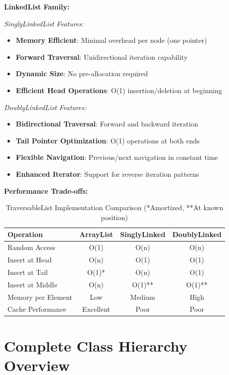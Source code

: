 \documentclass[12pt,a4paper]{article}
\begin{document}
\textbf{LinkedList Family:}

\textit{SinglyLinkedList Features:}
\begin{itemize}
    \item \textbf{Memory Efficient}: Minimal overhead per node (one pointer)
    \item \textbf{Forward Traversal}: Unidirectional iteration capability
    \item \textbf{Dynamic Size}: No pre-allocation required
    \item \textbf{Efficient Head Operations}: O(1) insertion/deletion at beginning
\end{itemize}

\textit{DoublyLinkedList Features:}
\begin{itemize}
    \item \textbf{Bidirectional Traversal}: Forward and backward iteration
    \item \textbf{Tail Pointer Optimization}: O(1) operations at both ends
    \item \textbf{Flexible Navigation}: Previous/next navigation in constant time
    \item \textbf{Enhanced Iterator}: Support for reverse iteration patterns
\end{itemize}

\textbf{Performance Trade-offs:}
\begin{table}[h!]
\centering
\begin{tabular}{|l|c|c|c|}
\hline
\textbf{Operation} & \textbf{ArrayList} & \textbf{SinglyLinked} & \textbf{DoublyLinked} \\
\hline
Random Access & O(1) & O(n) & O(n) \\
Insert at Head & O(n) & O(1) & O(1) \\
Insert at Tail & O(1)* & O(n) & O(1) \\
Insert at Middle & O(n) & O(1)** & O(1)** \\
Memory per Element & Low & Medium & High \\
Cache Performance & Excellent & Poor & Poor \\
\hline
\end{tabular}
\caption{TraversableList Implementation Comparison (*Amortized, **At known position)}
\end{table}

\section{Complete Class Hierarchy Overview}
\end{document}
